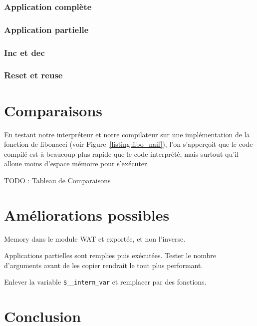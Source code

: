 \documentclass{rapportECL}
\begin{document}
\subsubsection{Application complète}

\subsubsection{Application partielle}

\subsubsection{Inc et dec}

\subsubsection{Reset et reuse}

\section{Comparaisons}

En testant notre interpréteur et notre compilateur sur une implémentation de la fonction de fibonacci 
(voir Figure~\ref{listing:fibo_naif}), l'on s'apperçoit que le code compilé est à beaucoup plus rapide que le code interprété,
mais surtout qu'il alloue moins d'espace mémoire pour s'exécuter.

TODO : Tableau de Comparaisons

\section{Améliorations possibles}

Memory dans le module WAT et exportée, et non l'inverse.

Applications partielles sont remplies puis exécutées. 
Tester le nombre d'arguments avant de les copier rendrait le tout plus performant.

Enlever la variable \verb|$__intern_var| et remplacer par des fonctions.

\section{Conclusion}

\printbibliography
\end{document}
